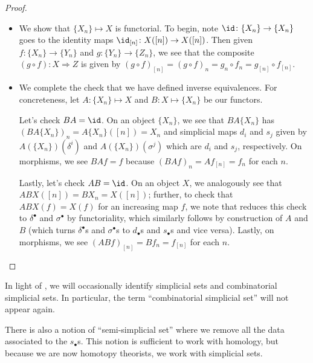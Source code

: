 \documentclass[../notes.tex]{subfiles}
\begin{document}
\begin{proof}
\begin{itemize}
		\item We show that $\{X_n\}\mapsto X$ is functorial. To begin, note $\id\colon\{X_n\}\to\{X_n\}$ goes to the identity maps $\id_{[n]}\colon X([n])\to X([n])$. Then given $f\colon\{X_n\}\to\{Y_n\}$ and $g\colon\{Y_n\}\to\{Z_n\}$, we see that the composite $(g\circ f)\colon X\Rightarrow Z$ is given by $(g\circ f)_{[n]}=(g\circ f)_n=g_n\circ f_n=g_{[n]}\circ f_{[n]}$.

		\item We complete the check that we have defined inverse equivalences. For concreteness, let $A\colon\{X_n\}\mapsto X$ and $B\colon X\mapsto\{X_n\}$ be our functors.
		
		Let's check $BA=\id$. On an object $\{X_n\}$, we see that $BA\{X_n\}$ has $(BA\{X_n\})_n=A\{X_n\}([n])=X_n$ and simplicial maps $d_i$ and $s_j$ given by $A(\{X_n\})(\delta^i)$ and $A(\{X_n\})(\sigma^j)$ which are $d_i$ and $s_j$, respectively. On morphisms, we see $BAf=f$ because $(BAf)_n=Af_{[n]}=f_n$ for each $n$.
		
		Lastly, let's check $AB=\id$. On an object $X$, we analogously see that $ABX([n])=BX_n=X([n])$; further, to check that $ABX(f)=X(f)$ for an increasing map $f$, we note that  reduces this check to $\delta^\bullet$ and $\sigma^\bullet$ by functoriality, which similarly follows by construction of $A$ and $B$ (which turns $\delta^\bullet$s and $\sigma^\bullet$s to $d_\bullet$s and $s_\bullet$s and vice versa). Lastly, on morphisms, we see $(ABf)_{[n]}=Bf_n=f_{[n]}$ for each $n$.
		\qedhere
	\end{itemize}
\end{proof}
\begin{remark}
	In light of , we will occasionally identify simplicial sets and combinatorial simplicial sets. In particular, the term ``combinatorial simplicial set'' will not appear again.
\end{remark}
\begin{remark}
	There is also a notion of ``semi-simplicial set'' where we remove all the data associated to the $s_\bullet$s. This notion is sufficient to work with homology, but because we are now homotopy theorists, we work with simplicial sets.
\end{remark}
\end{document}
